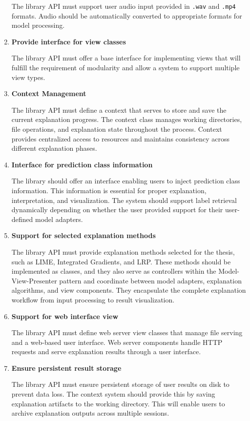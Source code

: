 \documentclass[
    bindingoffset=5mm,  %
    footnoteindent=3mm, %
    hyphenation=true    %
]{src/wut-thesis}
\begin{document}
\begin{enumerate}[itemsep=1\baselineskip]
        The library API must support user audio input provided in \texttt{.wav} and \texttt{.mp4} formats.
    Audio should be automatically converted to appropriate formats for model processing.

    \item \textbf{Provide interface for view classes}

        The library API must offer a base interface for implementing views that will fulfill
    the requirement of modularity and allow a system to support multiple view types.

    \item \textbf{Context Management}

        The library API must define a context that serves to store and save the current explanation progress.
    The context class manages working directories, file operations, and explanation state throughout the process.
    Context provides centralized access to resources and maintains consistency across different explanation phases.

    \item \textbf{Interface for prediction class information}

        The library should offer an interface enabling users to inject prediction class information.
    This information is essential for proper explanation, interpretation, and visualization.
    The system should support label retrieval dynamically depending on whether the user provided
    support for their user-defined model adapters.

    \item \textbf{Support for selected explanation methods}

        The library API must provide explanation methods selected for the thesis, such as LIME,
    Integrated Gradients, and LRP. These methods should be implemented as classes, and they also
    serve as controllers within the Model-View-Presenter pattern and coordinate between model
    adapters, explanation algorithms, and view components. They encapsulate the complete
    explanation workflow from input processing to result visualization.

    \item \textbf{Support for web interface view}

        The library API must define web server view classes that manage file serving and a web-based user
    interface. Web server components handle HTTP requests and serve explanation results through
    a user interface.

    \item \textbf{Ensure persistent result storage}

        The library API must ensure persistent storage of user results on disk to prevent
    data loss. The context system should provide this by saving explanation artifacts to
    the working directory. This will enable users to archive explanation outputs across 
    multiple sessions.
    
    \end{enumerate}
\end{document}
